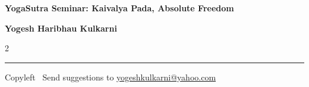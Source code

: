 \documentclass[9pt,a4paper,landscape]{article}
\begin{document}
\footnotesize

\begin{center}
\Large{\textbf{YogaSutra Seminar: Kaivalya Pada, Absolute Freedom}}

\small{\textbf{Yogesh Haribhau Kulkarni}}
\end{center}

\begin{multicols}{2}

\end{multicols}

\rule{\linewidth}{0.25pt}
\scriptsize
Copyleft \textcopyleft\  Send suggestions to
\href{http://www.yogeshkulkarni.com}{yogeshkulkarni@yahoo.com}
\end{document}
